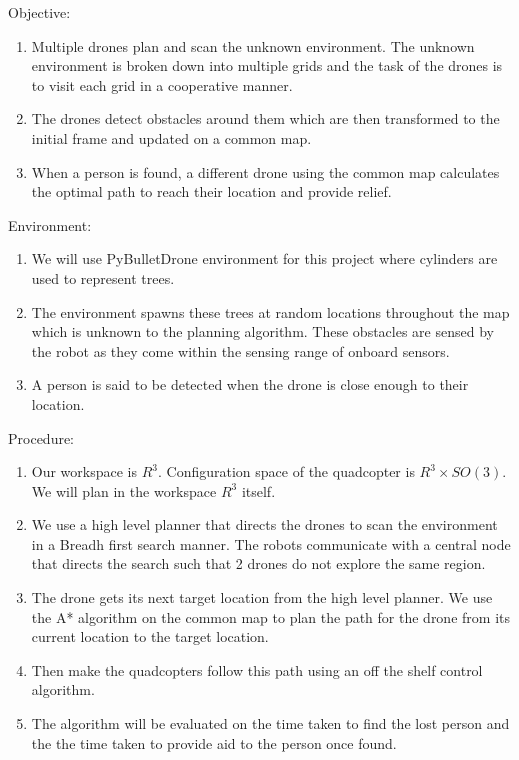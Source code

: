 Objective:
\begin{enumerate}
    \item Multiple drones plan and scan the unknown environment. The unknown environment is broken down into multiple grids and the task of the drones is to visit each grid in a cooperative manner.
    \item The drones detect obstacles around them which are then transformed to the initial frame and updated on a common map.
    \item When a person is found, a different drone using the common map calculates the optimal path to reach their location and provide relief.
\end{enumerate}
Environment:
\begin{enumerate}
    \item We will use PyBulletDrone environment for this project where cylinders are used to represent trees.
    \item The environment spawns these trees at random locations throughout the map which is unknown to the planning algorithm. These obstacles are sensed by the robot as they come within the sensing range of onboard sensors.
    \item A person is said to be detected when the drone is close enough to their location.
\end{enumerate}
Procedure:
\begin{enumerate}
    \item Our workspace is \(R^3\). Configuration space of the quadcopter is \(R^3 \times SO(3)\). We will plan in the workspace \(R^3\) itself.
    \item We use a high level planner that directs the drones to scan the environment in a Breadh first search manner. The robots communicate with a central node that directs the search such that 2 drones do not explore the same region.
    \item The drone gets its next target location from the high level planner. We use the A* algorithm on the common map to plan the path for the drone from its current location to the target location.
    \item Then make the quadcopters follow this path using an off the shelf control algorithm.
    \item The algorithm will be evaluated on the time taken to find the lost person and the the time taken to provide aid to the person once found.
\end{enumerate}
